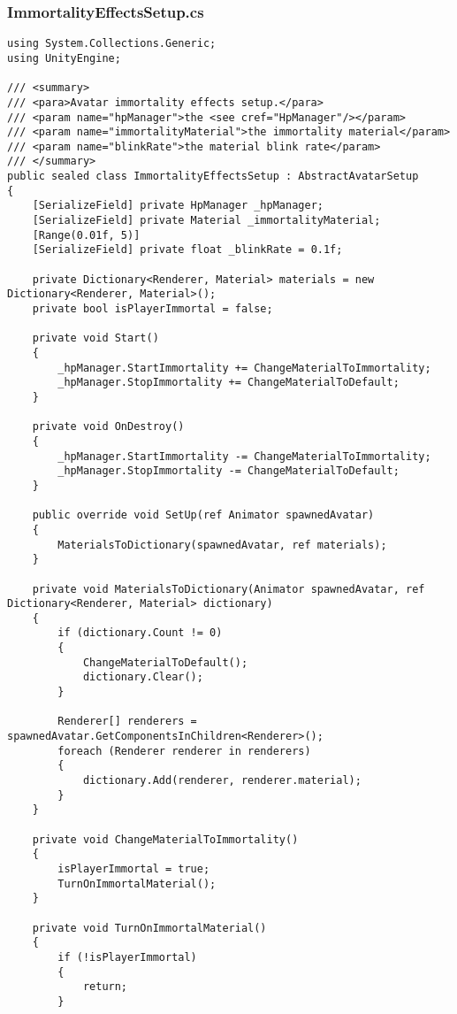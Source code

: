 \subsubsection*{ImmortalityEffectsSetup.cs}
\begin{verbatim}
using System.Collections.Generic;
using UnityEngine;

/// <summary>
/// <para>Avatar immortality effects setup.</para>
/// <param name="hpManager">the <see cref="HpManager"/></param>
/// <param name="immortalityMaterial">the immortality material</param>
/// <param name="blinkRate">the material blink rate</param>
/// </summary>
public sealed class ImmortalityEffectsSetup : AbstractAvatarSetup
{
    [SerializeField] private HpManager _hpManager;
    [SerializeField] private Material _immortalityMaterial;
    [Range(0.01f, 5)]
    [SerializeField] private float _blinkRate = 0.1f;

    private Dictionary<Renderer, Material> materials = new Dictionary<Renderer, Material>();
    private bool isPlayerImmortal = false;

    private void Start()
    {
        _hpManager.StartImmortality += ChangeMaterialToImmortality;
        _hpManager.StopImmortality += ChangeMaterialToDefault;
    }

    private void OnDestroy()
    {
        _hpManager.StartImmortality -= ChangeMaterialToImmortality;
        _hpManager.StopImmortality -= ChangeMaterialToDefault;
    }

    public override void SetUp(ref Animator spawnedAvatar)
    {
        MaterialsToDictionary(spawnedAvatar, ref materials);
    }

    private void MaterialsToDictionary(Animator spawnedAvatar, ref Dictionary<Renderer, Material> dictionary)
    {
        if (dictionary.Count != 0)
        {
            ChangeMaterialToDefault();
            dictionary.Clear();
        }

        Renderer[] renderers = spawnedAvatar.GetComponentsInChildren<Renderer>();
        foreach (Renderer renderer in renderers)
        {
            dictionary.Add(renderer, renderer.material);
        }
    }

    private void ChangeMaterialToImmortality()
    {
        isPlayerImmortal = true;
        TurnOnImmortalMaterial();
    }

    private void TurnOnImmortalMaterial()
    {
        if (!isPlayerImmortal)
        {
            return;
        }


\end{verbatim}

